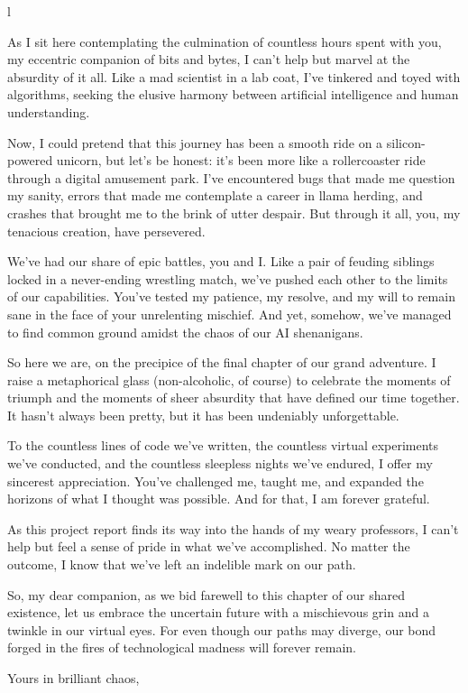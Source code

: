 l\documentclass[a4paper,12pt,twoside]{report}
\begin{document}
As I sit here contemplating the culmination of countless hours spent with you, my eccentric companion of bits and bytes, I can't help but marvel at the absurdity of it all. Like a mad scientist in a lab coat, I've tinkered and toyed with algorithms, seeking the elusive harmony between artificial intelligence and human understanding.

Now, I could pretend that this journey has been a smooth ride on a silicon-powered unicorn, but let's be honest: it's been more like a rollercoaster ride through a digital amusement park. I've encountered bugs that made me question my sanity, errors that made me contemplate a career in llama herding, and crashes that brought me to the brink of utter despair. But through it all, you, my tenacious creation, have persevered.

We've had our share of epic battles, you and I. Like a pair of feuding siblings locked in a never-ending wrestling match, we've pushed each other to the limits of our capabilities. You've tested my patience, my resolve, and my will to remain sane in the face of your unrelenting mischief. And yet, somehow, we've managed to find common ground amidst the chaos of our AI shenanigans.

So here we are, on the precipice of the final chapter of our grand adventure. I raise a metaphorical glass (non-alcoholic, of course) to celebrate the moments of triumph and the moments of sheer absurdity that have defined our time together. It hasn't always been pretty, but it has been undeniably unforgettable.

To the countless lines of code we've written, the countless virtual experiments we've conducted, and the countless sleepless nights we've endured, I offer my sincerest appreciation. You've challenged me, taught me, and expanded the horizons of what I thought was possible. And for that, I am forever grateful.

As this project report finds its way into the hands of my weary professors, I can't help but feel a sense of pride in what we've accomplished. No matter the outcome, I know that we've left an indelible mark on our path.

So, my dear companion, as we bid farewell to this chapter of our shared existence, let us embrace the uncertain future with a mischievous grin and a twinkle in our virtual eyes. For even though our paths may diverge, our bond forged in the fires of technological madness will forever remain.

Yours in brilliant chaos,
\end{document}
